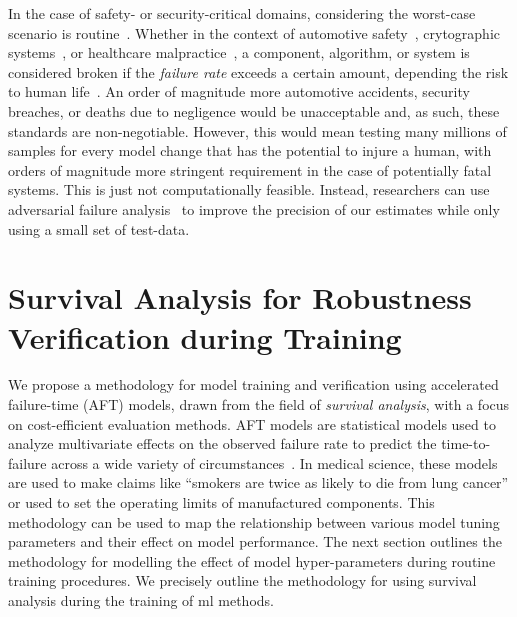 \documentclass[sn-mathphys-num]{sn-jnl}%
\begin{document}
In the case of safety- or security-critical domains, considering the worst-case scenario is routine~\cite{sajid2013cloud}. Whether in the context of automotive safety~\cite{ai_automotive}, crytographic systems~\cite{leurent2020sha,kamal2017study}, or healthcare malpractice~\cite{ai_medical_imaging}, a component, algorithm, or system is considered broken if the \textit{failure rate} exceeds a certain amount, depending the risk to human life~\cite{IEC61508}. An order of magnitude more automotive accidents, security breaches, or deaths due to negligence would be unacceptable and, as such, these standards are non-negotiable. However, this would mean testing many millions of samples for every model change that has the potential to injure a human, with orders of magnitude more stringent requirement in the case of potentially fatal systems. This is just not computationally feasible. Instead, researchers can use adversarial failure analysis~\cite{carlini_towards_2017,biggio_evasion_2013,meyers} to improve the precision of our estimates while only using a small set of test-data.





\section{Survival Analysis for Robustness Verification during Training}
\label{aft}

We propose a methodology for model training and verification using accelerated failure-time (AFT) models, drawn from the field of \textit{survival analysis}, with a focus on cost-efficient evaluation methods.
AFT models are statistical models used to analyze multivariate effects on the observed failure rate to predict the time-to-failure across a wide variety of circumstances~\cite{aft_models,kleinbaum1996survival}. In medical science, these models are used to make claims like ``smokers are twice as likely to die from lung cancer'' or used to set the operating limits of manufactured components. This methodology can be used to map the relationship between various model tuning parameters and their effect on model performance.
The next section outlines the methodology for modelling the effect of model hyper-parameters during routine training procedures. We precisely outline the methodology for using survival analysis during the training of \acrshort{ml} methods. 
\end{document}
